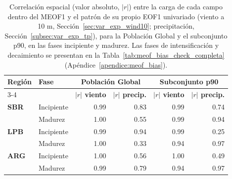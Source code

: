 \begin{table}[htbp]
\centering
\caption[Correlación espacial entre el MEOF1 y los EOF1 univariados (Global y p90)]{Correlación espacial (valor absoluto, $|r|$) entre la carga de cada campo dentro del MEOF1 y el patrón de su propio EOF1 univariado (viento a 10 m, Sección~\ref{sec:var_exp_wind10}; precipitación, Sección~\ref{subsec:var_exp_tp}), para la Población Global y el subconjunto p90, en las fases incipiente y madurez. Las fases de intensificación y decaimiento se presentan en la Tabla~\ref{tab:meof_bias_check_completa} (Apéndice~\ref{apendice:meof_bias}).}
\label{tab:meof_bias_check}
\begin{tabular*}{\textwidth}{@{\extracolsep{\fill}}llrrrr}
\hline
\textbf{Región} & \textbf{Fase} & \multicolumn{2}{c}{\textbf{Población Global}} & \multicolumn{2}{c}{\textbf{Subconjunto p90}} \\
\cline{3-4} \cline{5-6}
 & & \textbf{$|r|$ viento} & \textbf{$|r|$ precip.} & \textbf{$|r|$ viento} & \textbf{$|r|$ precip.} \\
\hline
\textbf{SBR} & Incipiente & 0.99 & 0.83 & 0.99 & 0.74 \\
 & Madurez & 1.00 & 0.55 & 0.99 & 0.94 \\
\hline
\textbf{LPB} & Incipiente & 0.99 & 0.94 & 0.99 & 0.25 \\
 & Madurez & 1.00 & 0.33 & 0.94 & 0.97 \\
\hline
\textbf{ARG} & Incipiente & 1.00 & 0.56 & 1.00 & 0.49 \\
 & Madurez & 0.99 & 0.79 & 0.94 & 0.97 \\
\hline
\end{tabular*}
\end{table}

